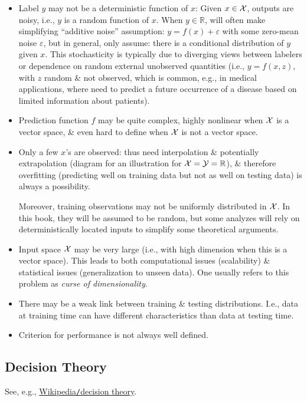 \documentclass{article}
\begin{document}
\begin{itemize}
	\item Label $y$ may not be a deterministic function of $x$: Given $x\in{\cal X}$, outputs are noisy, i.e., $y$ is a random function of $x$. When $y\in\mathbb{R}$, will often make simplifying ``additive noise'' assumption: $y = f(x) + \varepsilon$ with some zero-mean noise $\varepsilon$, but in general, only assume: there is a conditional distribution of $y$ given $x$. This stochasticity is typically due to diverging views between labelers or dependence on random external unobserved quantities (i.e., $y = f(x,z)$, with $z$ random \& not observed, which is common, e.g., in medical applications, where need to predict a future occurrence of a disease based on limited information about patients).
	\item Prediction function $f$ may be quite complex, highly nonlinear when ${\cal X}$ is a vector space, \& even hard to define when ${\cal X}$ is not a vector space.
	\item Only a few $x$'s are observed: thus need interpolation \& potentially extrapolation ({\sf diagram for an illustration for ${\cal X} = {\cal Y} = \mathbb{R}$}), \& therefore overfitting (predicting well on training data but not as well on testing data) is always a possibility.
	
	Moreover, training observations may not be uniformly distributed in ${\cal X}$. In this book, they will be assumed to be random, but some analyzes will rely on deterministically located inputs to simplify some theoretical arguments.
	\item Input space ${\cal X}$ may be very large (i.e., with high dimension when this is a vector space). This leads to both computational issues (scalability) \& statistical issues (generalization to unseen data). One usually refers to this problem as {\it curse of dimensionality}.
	\item There may be a weak link between training \& testing distributions. I.e., data at training time can have different characteristics than data at testing time.
	\item Criterion for performance is not always well defined.
\end{itemize}


\subsection{Decision Theory}
See, e.g., \href{https://en.wikipedia.org/wiki/Decision_theory}{Wikipedia{\tt/}decision theory}.
\end{document}
